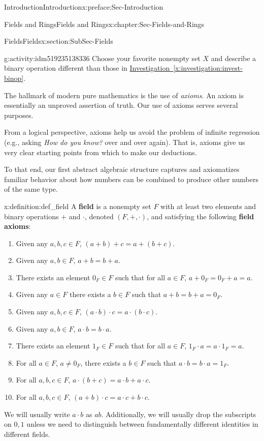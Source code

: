 \documentclass[oneside,10pt,]{book}
\newcommand{\xreffont}{\relax}
\newcommand{\terminology}[1]{\textbf{#1}}
\numberwithin{equation}{section}
\begin{document}
\begin{preface}{Introduction}{}{Introduction}{}{}{x:preface:Sec-Introduction}
\begin{chapterptx}{Fields and Rings}{}{Fields and Rings}{}{}{x:chapter:Sec-Fields-and-Rings}
\begin{sectionptx}{Fields}{}{Fields}{}{}{x:section:SubSec-Fields}
\begin{activity}{}{g:activity:idm519235138336}
Choose your favorite nonempty set \(X\) and describe a binary operation different than those in \hyperref[x:investigation:invest-binop]{Investigation~{\xreffont\ref{x:investigation:invest-binop}}}.%
\end{activity}
The hallmark of modern pure mathematics is the use of \emph{axioms}. An axiom is essentially an unproved assertion of truth. Our use of axioms serves several purposes.%
\par
From a logical perspective, axioms help us avoid the problem of infinite regression (e.g., asking \emph{How do you know?} over and over again). That is, axioms give us very clear starting points from which to make our deductions.%
\par
To that end, our first abstract algebraic structure captures and axiomatizes familiar behavior about how numbers can be combined to produce other numbers of the same type.%
\begin{definition}{}{x:definition:def_field}%
%
A \terminology{field} is a nonempty set \(F\) with at least two elements and binary operations \(+\) and \(\cdot\), denoted \((F,+,\cdot)\), and satisfying the following \terminology{field axioms}:%
\begin{enumerate}
\item{}Given any \(a,b,c\in F\), \((a+b)+c = a+(b+c)\).%
\item{}Given any \(a,b\in F\), \(a+b= b+a\).%
\item{}There exists an element \(0_F\in F\) such that for all \(a\in F\), \(a+0_F = 0_F + a = a\).%
\item{}Given any \(a\in F\) there exists a \(b\in F\) such that \(a+b = b + a =0_F\).%
\item{}Given any \(a,b,c\in F\), \((a\cdot b)\cdot c = a\cdot (b\cdot c)\).%
\item{}Given any \(a,b\in F\), \(a\cdot b = b\cdot a\).%
\item{}There exists an element \(1_F\in F\) such that for all \(a\in F\), \(1_F\cdot a = a\cdot 1_F = a\).%
\item{}For all \(a\in F\), \(a\ne 0_F\), there exists a \(b\in F\) such that \(a\cdot b = b\cdot a = 1_F\).%
\item{}For all \(a,b,c\in F\), \(a\cdot (b+c) = a\cdot b + a\cdot c\).%
\item{}For all \(a,b,c\in F\), \((a+b)\cdot c = a\cdot c + b\cdot c\).%
\end{enumerate}
%
\end{definition}
We will usually write \(a\cdot b\) as \(ab\). Additionally, we will usually drop the subscripts on \(0,1\) unless we need to distinguish between fundamentally different identities in different fields.%

\end{sectionptx}
\end{chapterptx}
\end{preface}
\end{document}
